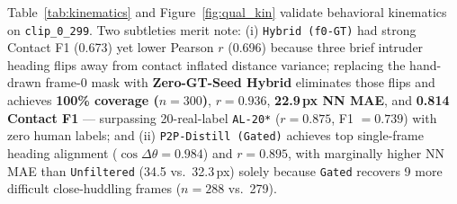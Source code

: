 \documentclass[10pt,twocolumn,letterpaper]{article}
\begin{document}
\begin{table}[t]
  \centering
  \caption{\textbf{Downstream dyadic social kinematics on real \texttt{clip\_0\_299}.} NN: nose-to-nose distance; AG: resident-nose to intruder-tail-base distance; Contact F1: bouts with $d_{\text{NN}}<80$\,px; $\cos\Delta\theta$: heading alignment.}
  \label{tab:kinematics}
  \renewcommand{\arraystretch}{0.86}
\end{table}

Table~\ref{tab:kinematics} and Figure~\ref{fig:qual_kin} validate behavioral kinematics on \texttt{clip\_0\_299}. Two subtleties merit note: (i) \texttt{Hybrid (f0-GT)} had strong Contact F1 (0.673) yet lower Pearson $r$ (0.696) because three brief intruder heading flips away from contact inflated distance variance; replacing the hand-drawn frame-0 mask with \textbf{Zero-GT-Seed Hybrid} eliminates those flips and achieves \textbf{100\% coverage ($n=300$)}, \textbf{$r=0.936$}, \textbf{22.9\,px NN MAE}, and \textbf{0.814 Contact F1} — surpassing 20-real-label \texttt{AL-20*} ($r=0.875$, F1 $=0.739$) with zero human labels; and (ii) \texttt{P2P-Distill (Gated)} achieves top single-frame heading alignment ($\cos\Delta\theta=0.984$) and $r=0.895$, with marginally higher NN MAE than \texttt{Unfiltered} (34.5 vs.\ 32.3\,px) solely because \texttt{Gated} recovers 9 more difficult close-huddling frames ($n=288$ vs.\ 279).
\end{document}
